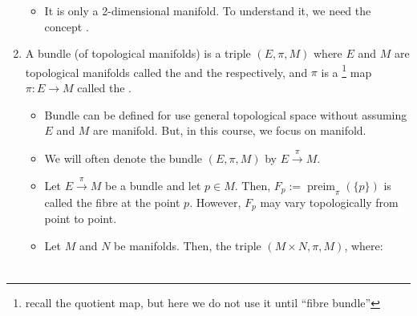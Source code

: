 \documentclass{article}
\begin{document}
\begin{enumerate}
\begin{itemize}
    \item {} It is only a 2-dimensional manifold. To understand it, we need the concept .
    \begin{center}
\end{center}
\end{itemize}
\item {}  A bundle (of topological manifolds) is a triple $(E, \pi, M)$ where $E$ and $M$ are topological manifolds called the  and the  respectively, and ${\pi}$ is a \footnote{recall the quotient map, but here we do not use it until ``fibre bundle''} map $\pi: E \rightarrow M$ called the .
\begin{itemize}
\item Bundle can be defined for use general topological space without assuming $E$ and $M$ are manifold. But, in this course, we focus on manifold.
    \item {} We will often denote the bundle $(E, \pi, M)$ by $E \stackrel{\pi}{\rightarrow} M$.
    \item {} Let $E \stackrel{\pi}{\rightarrow} M$ be a bundle and let $p \in M$. Then, $F_{p}:=\operatorname{preim}_{\pi}(\{p\})$ is called the fibre at the point $p$. However, $F_p$ may vary topologically from point to point.
   \item {} Let $M$ and $N$ be manifolds. Then, the triple $(M \times N, \pi, M)$, where:
\begin{align*}
\begin{aligned}

\end{aligned}
\end{align*}
\end{itemize}
\end{enumerate}
\end{document}
